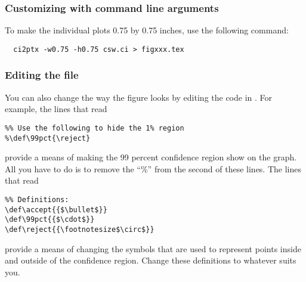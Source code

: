 \subsubsection{Customizing with command line arguments}
 
To make the individual plots 0.75 by 0.75 inches, use the following
command:
\begin{verbatim}
  ci2ptx -w0.75 -h0.75 csw.ci > figxxx.tex
\end{verbatim}

\subsubsection{Editing the \PiCTeX{} file}

You can also change the way the figure looks by editing the \PiCTeX{}
code in .  For example, the lines that read
\begin{verbatim}
%% Use the following to hide the 1% region
%\def\99pct{\reject}
\end{verbatim}
provide a means of making the 99 percent confidence region show on the
graph.  All you have to do is to remove the ``\%'' from the second of
these lines.  The lines that read
\begin{verbatim}
%% Definitions:
\def\accept{{$\bullet$}}
\def\99pct{{$\cdot$}}
\def\reject{{\footnotesize$\circ$}}
\end{verbatim}
provide a means of changing the symbols that are used to represent
points inside and outside of the confidence region.  Change these
definitions to whatever suits you.


